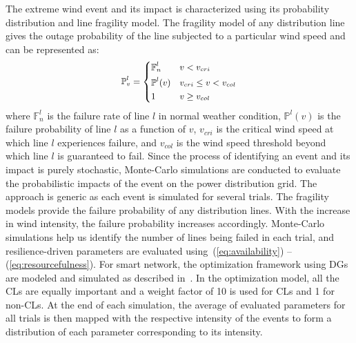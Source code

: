 \documentclass[hidelinks, 12pt]{article}
\begin{document}
The extreme wind event and its impact is characterized using its probability distribution and line fragility model. The fragility model of any distribution line gives the outage probability of the line subjected to a particular wind speed and can be represented as:
\vspace{-5pt}
\begin{equation} \small 
\begin{aligned}
&\mathbb{P}_v^l= \begin{dcases}\mathbb{F}_n^l & v < v_{cri} \\
\mathbb{P}^l (v)  & v_{cri} \leq v < v_{col} \\
1 & v \geq v_{col} 
\end{dcases} \\
\end{aligned}
\label{eq:outage}
\vspace{-3pt}
\end{equation}
where $\mathbb{F}_n^l$ is the failure rate of line $l$ in normal weather condition, $\mathbb{P}^l (v)$ is the failure probability of line $l$ as a function of $v$, $v_{cri}$ is the critical wind speed at which line $l$ experiences failure, and $v_{col}$ is the wind speed threshold beyond which line $l$ is guaranteed to fail. Since the process of identifying an event and its impact is purely stochastic, Monte-Carlo simulations are conducted to evaluate the probabilistic impacts of the event on the power distribution grid. The approach is generic as each event is simulated for several trials. The fragility models provide the failure probability of any distribution lines. With the increase in wind intensity, the failure probability increases accordingly. Monte-Carlo simulations help us identify the number of lines being failed in each trial, and resilience-driven parameters are evaluated using~(\ref{eq:availability}) -- (\ref{eq:resourcefulness}). For smart network, the optimization framework using DGs are modeled and simulated as described in~\cite{poudel2018critical}. In the optimization model, all the CLs are equally important and a weight factor of 10 is used for CLs and 1 for non-CLs. At the end of each simulation, the average of evaluated parameters for all trials is then mapped with the respective intensity of the events to form a distribution of each parameter corresponding to its intensity. 
\end{document}
